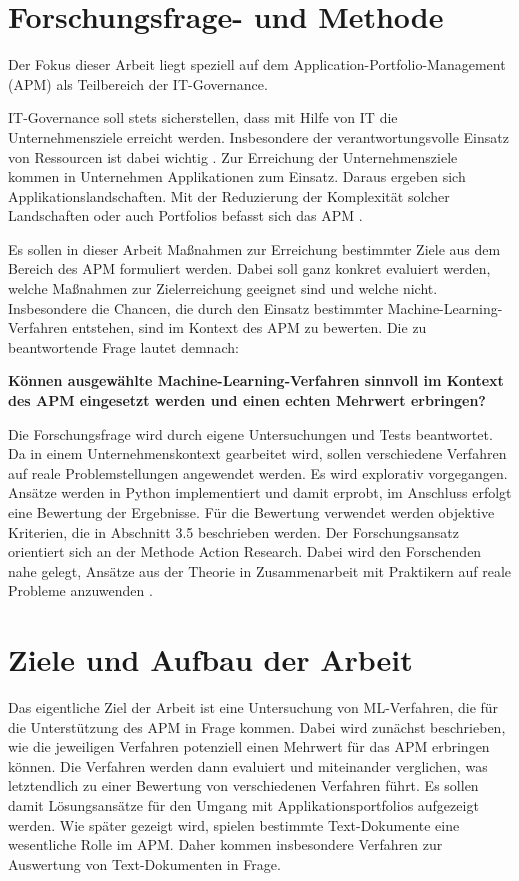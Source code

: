 \section{Forschungsfrage- und Methode}

Der Fokus dieser Arbeit liegt speziell auf dem Application-Portfolio-Management (APM) als Teilbereich der IT-Governance. 

IT-Governance soll stets sicherstellen, dass mit Hilfe von IT die Unternehmensziele erreicht werden. Insbesondere der verantwortungsvolle Einsatz von Ressourcen ist dabei wichtig \cite{rueter}. Zur Erreichung der Unternehmensziele kommen in Unternehmen Applikationen zum Einsatz. Daraus ergeben sich Applikationslandschaften. Mit der Reduzierung der Komplexität solcher Landschaften oder auch Portfolios befasst sich das APM \cite{schoder}. 

Es sollen in dieser Arbeit Maßnahmen zur Erreichung bestimmter Ziele aus dem Bereich des APM formuliert werden. Dabei soll ganz konkret evaluiert werden, welche Maßnahmen zur Zielerreichung geeignet sind und welche nicht. Insbesondere die Chancen, die durch den Einsatz bestimmter Machine-Learning-Verfahren entstehen, sind im Kontext des APM zu bewerten. Die zu beantwortende Frage lautet demnach: 

{\bf Können ausgewählte Machine-Learning-Verfahren sinnvoll im Kontext des APM eingesetzt werden und einen echten Mehrwert erbringen?}

Die Forschungsfrage wird durch eigene Untersuchungen und Tests beantwortet. Da in einem Unternehmenskontext gearbeitet wird, sollen verschiedene Verfahren auf reale Problemstellungen angewendet werden. Es wird explorativ vorgegangen. Ansätze werden in Python implementiert und damit erprobt, im Anschluss erfolgt eine Bewertung der Ergebnisse. Für die Bewertung verwendet werden objektive Kriterien, die in Abschnitt 3.5 beschrieben werden. Der Forschungsansatz orientiert sich an der Methode Action Research. Dabei wird den Forschenden nahe gelegt, Ansätze aus der Theorie in Zusammenarbeit mit Praktikern auf reale Probleme anzuwenden \cite{Avison}. 


\section{Ziele und Aufbau der Arbeit}

Das eigentliche Ziel der Arbeit ist eine Untersuchung von ML-Verfahren, die für die Unterstützung des APM in Frage kommen. Dabei wird zunächst beschrieben, wie die jeweiligen Verfahren potenziell einen Mehrwert für das APM erbringen können. Die Verfahren werden dann evaluiert und miteinander verglichen, was letztendlich zu einer Bewertung von verschiedenen Verfahren führt. Es sollen damit Lösungsansätze für den Umgang mit Applikationsportfolios aufgezeigt werden. Wie später gezeigt wird, spielen bestimmte Text-Dokumente eine wesentliche Rolle im APM. Daher kommen insbesondere Verfahren zur Auswertung von Text-Dokumenten in Frage. 

